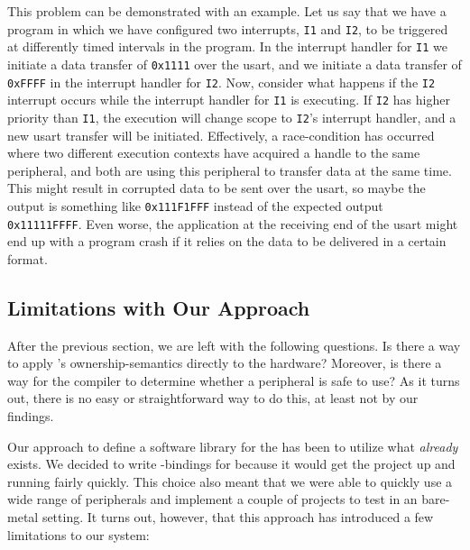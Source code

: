 This problem can be demonstrated with an example.
Let us say that we have a program in which we have configured two interrupts, \texttt{I1} and \texttt{I2}, to be triggered at differently timed intervals in the program.
In the interrupt handler for \texttt{I1} we initiate a data transfer of \texttt{0x1111} over the \gls{usart}, and we initiate a data transfer of \texttt{0xFFFF} in the interrupt handler for \texttt{I2}.
Now, consider what happens if the \texttt{I2} interrupt occurs while the interrupt handler for \texttt{I1} is executing.
If \texttt{I2} has higher priority than \texttt{I1}, the execution will change scope to \texttt{I2}'s interrupt handler, and a new \gls{usart} transfer will be initiated.
Effectively, a race-condition has occurred where two different execution contexts have acquired a handle to the same peripheral, and both are using this peripheral to transfer data at the same time.
This might result in corrupted data to be sent over the \gls{usart}, so maybe the output is something like \texttt{0x111F1FFF} instead of the expected output \texttt{0x11111FFFF}.
Even worse, the application at the receiving end of the \gls{usart} might end up with a program crash if it relies on the data to be delivered in a certain format.

\subsection{Limitations with Our Approach}

After the previous section, we are left with the following questions.
Is there a way to apply {\rust}'s ownership-semantics directly to the hardware?
Moreover, is there a way for the {\rust} compiler to determine whether a peripheral is safe to use?
As it turns out, there is no easy or straightforward way to do this, at least not by our findings.

Our approach to define a software library for the {\gecko} has been to utilize what \emph{already} exists.
We decided to write {\rust}-bindings for {\emlib} because it would get the project up and running fairly quickly.
This choice also meant that we were able to quickly use a wide range of peripherals and implement a couple of projects to test {\rust} in an bare-metal setting.
It turns out, however, that this approach has introduced a few limitations to our system:

